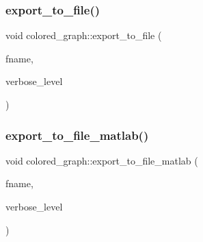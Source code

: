 \mbox{\label{classcolored__graph_a51fe2bb2a48069027ffef04450678b13}} 
\subsubsection{\texorpdfstring{export\+\_\+to\+\_\+file()}{export\_to\_file()}}
{\footnotesize\ttfamily void colored\+\_\+graph\+::export\+\_\+to\+\_\+file (\begin{DoxyParamCaption}\item[{const \mbox{\hyperlink{galois_8h_ab6cc7b4aeb6ea31aba2b3fbfc83ff5e6}{B\+Y\+TE}} $\ast$}]{fname,  }\item[{\mbox{\hyperlink{galois_8h_a09fddde158a3a20bd2dcadb609de11dc}{I\+NT}}}]{verbose\+\_\+level }\end{DoxyParamCaption})}

\mbox{\label{classcolored__graph_a07a854d04202de45bb78cd9ae6efd521}} 
\subsubsection{\texorpdfstring{export\+\_\+to\+\_\+file\+\_\+matlab()}{export\_to\_file\_matlab()}}
{\footnotesize\ttfamily void colored\+\_\+graph\+::export\+\_\+to\+\_\+file\+\_\+matlab (\begin{DoxyParamCaption}\item[{const \mbox{\hyperlink{galois_8h_ab6cc7b4aeb6ea31aba2b3fbfc83ff5e6}{B\+Y\+TE}} $\ast$}]{fname,  }\item[{\mbox{\hyperlink{galois_8h_a09fddde158a3a20bd2dcadb609de11dc}{I\+NT}}}]{verbose\+\_\+level }\end{DoxyParamCaption})}

\mbox{\label{classcolored__graph_a766c05f1b628f86b4de896bce33ec0f2}} 
